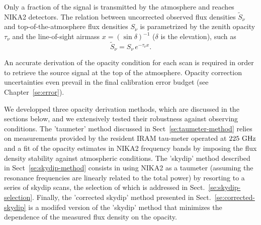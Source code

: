 %
%


Only a fraction of the signal is transmitted by the atmosphere and
reaches NIKA2 detectors. 
The relation between uncorrected observed flux densities
$\tilde{S}_{\nu}$ and top-of-the-atmosphere flux densities $S_{\nu}$
is parametrized by the zenith opacity $\tau_{\nu}$
and the line-of-sight airmass $x = \left(\sin\delta\right)^{-1}$ ($\delta$ is the elevation), such as
\begin{equation}
\tilde{S}_{\nu} = S_{\nu} \, e^{-\tau_{\nu}  x}.
\label{eq:uncorr_flux}
\end{equation}

An accurate derivation of the opacity condition for each scan is
required in order to retrieve the source signal at the top of the
atmosphere. Opacity correction uncertainties even prevail in the
final calibration error budget (see Chapter~\ref{se:error}).

We developped three opacity derivation methods, which are discussed in
the sections below, and we extensively tested their robustness against
observing conditions. The 'taumeter' method discussed in
Sect~\ref{se:taumeter-method} relies on measurements provided by the
resident IRAM tau-meter operated at $225~\rm{GHz}$ and a fit of the
opacity estimates in NIKA2 frequency bands by imposing the flux
density stability against atmospheric conditions. The 'skydip' method
described in Sect~\ref{se:skydip-method} consists in using NIKA2 as a
taumeter (assuming the resonance frequencies are linearly related to
the total power) by resorting to a series of skydip scans, the
selection of which is addressed in
Sect.~\ref{se:skydip-selection}. Finally, the 'corrected skydip'
method presented in Sect.~\ref{se:corrected-skydip} is a modifed
version of the 'skydip' method that minimizes the dependence of the
measured flux density on the opacity.\\


